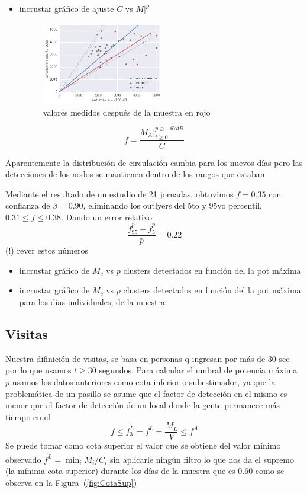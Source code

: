 \begin{itemize}
\item incrustar gráfico de ajuste $C$ vs $M\big|^p$
\begin{figure}[H] 
  \centering
  \includegraphics[width=0.5\textwidth]{scatter-sample-n-next.png}
  \caption{valores medidos después de la muestra en rojo
  }
  \label{fig:prediction}
\end{figure}

\end{itemize}

\[
f = \frac{M_A \Big|_{t\ge 0}^{p \ge -67dB}}{C}
\]

Aparentemente la distribución de circulación cambia para los nuevos días pero
las detecciones de los nodos se mantienen dentro de los rangos que estaban



Mediante el resultado de un estudio de 21 jornadas,
obtuvimos $\bar{f} = 0.35$ con confianza de $\beta = 0.90$,
eliminando los outlyers del 5to y 95vo percentil,
$0.31 \le \bar{f} \le 0.38$. Dando un error relativo 
\[
\frac{\bar{f}_{95}^p - \bar{f}_5^p}{\bar{p}} = 0.22
\]
(!) rever estos números


\begin{itemize}
\item incrustar gráfico de $M_c$ vs $p$ clusters detectados en función del la pot máxima
\item incrustar gráfico de $M_c$ vs $p$ clusters detectados en función del la pot máxima para los días individuales, de la muestra
\end{itemize}



\subsection{Visitas}
Nuestra difinición de visitas, se basa en personas q ingresan por más de 30 sec
por lo que usamos $t \ge 30$ segundos. Para calcular el umbral de potencia máxima $p$
usamos los datos anteriores como cota inferior o subestimador, 
ya que la problemática de un pasillo se asume que el factor de detección en el mismo 
es menor que al factor de detección de un local donde la gente permanece más tiempo en el.
\[
\bar{f} \le f^L_3 = f^L = \frac{M_L}{V} \le f^A
\]
Se puede tomar como cota superior el valor que se 
obtiene del valor mínimo observado 
$\widetilde{f^L} = \min_i M_i/C_i$ sin aplicarle ningún filtro
lo que nos da el supremo (la mínima cota superior)
durante los días de la muestra que es $0.60$ como se observa en la Figura~(\ref{fig:CotaSup})

